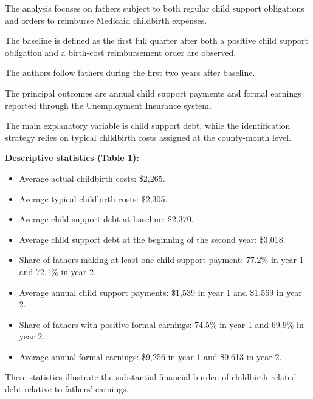 \documentclass{article}
\begin{document}
The analysis focuses on fathers subject to both
regular child support obligations and orders
to reimburse Medicaid childbirth expenses.

The baseline is defined as the first full quarter
after both a positive child support obligation
and a birth-cost reimbursement order are observed.

The authors follow fathers during the first
two years after baseline.

The principal outcomes are annual child support
payments and formal earnings reported through
the Unemployment Insurance system.

The main explanatory variable is child support
debt, while the identification strategy relies
on typical childbirth costs assigned at the
county-month level.

\medskip

\noindent
\textbf{Descriptive statistics (Table 1):}

\begin{itemize}

    \item Average actual childbirth costs:
    \$2,265.

    \item Average typical childbirth costs:
    \$2,305.

    \item Average child support debt at baseline:
    \$2,370.

    \item Average child support debt at the
    beginning of the second year:
    \$3,018.

    \item Share of fathers making at least
    one child support payment:
    77.2\% in year 1 and 72.1\% in year 2.

    \item Average annual child support payments:
    \$1,539 in year 1 and \$1,569 in year 2.

    \item Share of fathers with positive
    formal earnings:
    74.5\% in year 1 and 69.9\% in year 2.

    \item Average annual formal earnings:
    \$9,256 in year 1 and \$9,613 in year 2.

\end{itemize}

These statistics illustrate the substantial
financial burden of childbirth-related debt
relative to fathers' earnings.
\end{document}
